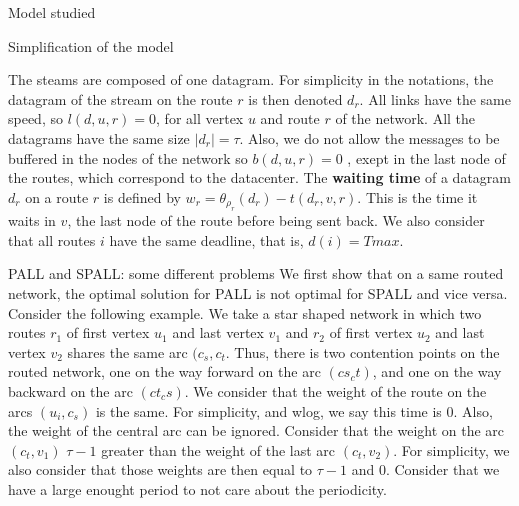 \documentclass[10pt]{article}
\newcommand\pall{\textsc{PALL}\xspace}
\newcommand\spall{\textsc{SPALL}\xspace}
\begin{document}
  \begin{section}{Model studied }
   \begin{subsection}{Simplification of the model}
 
   The steams are composed of one datagram. For simplicity in the notations, the datagram of the stream on the route $r$ is then denoted $d_r$. All links have the same speed, so $l(d,u,r)=0$, for all vertex $u$ and route $r$ of the network. All the datagrams have the same size $|d_r| = \tau$.
   Also, we do not allow the messages to be buffered in the nodes of the network so $b(d,u,r)=0$ , exept in the last node of the routes, which correspond to the datacenter.
   The \textbf{waiting time} of a datagram $d_r$ on a route $r$ is defined by $w_r = \theta_{\rho_r}(d_r) - t(d_r,v,r)$. This is the time it waits in $v$, the last node of the route before being sent back.
   We also consider that all routes $i$ have the same deadline, that is,  $d(i)= Tmax$.
   
  \end{subsection}
  \begin{subsection}{\pall and \spall: some different problems}
  We first show that on a same routed network, the optimal solution for \pall is not optimal for \spall and vice versa.
  Consider the following example. We take a star shaped network in which two routes $r_1$ of first vertex $u_1$ and last vertex $v_1$ and $r_2$ of first vertex $u_2$ and last vertex $v_2$ shares the same arc $(c_s,c_t$. Thus, there is two contention points on the routed network, one on the way forward on the arc $(cs_ct)$, and one on the way backward on the arc $(ct_cs)$.
  We consider that the weight of the route on the arcs $(u_i,c_s)$ is the same. For simplicity, and wlog, we say this time is $0$. Also, the weight of the central arc can be ignored.
  Consider that the weight on the arc $(c_t,v_1)$ $\tau -1$ greater than the weight of the last arc $(c_t,v_2)$. For simplicity, we also consider that those weights are then equal to $\tau-1$ and $0$.
  Consider that we have a large enought period to not care about the periodicity.\\
  

\end{subsection}
\end{section}
\end{document}
